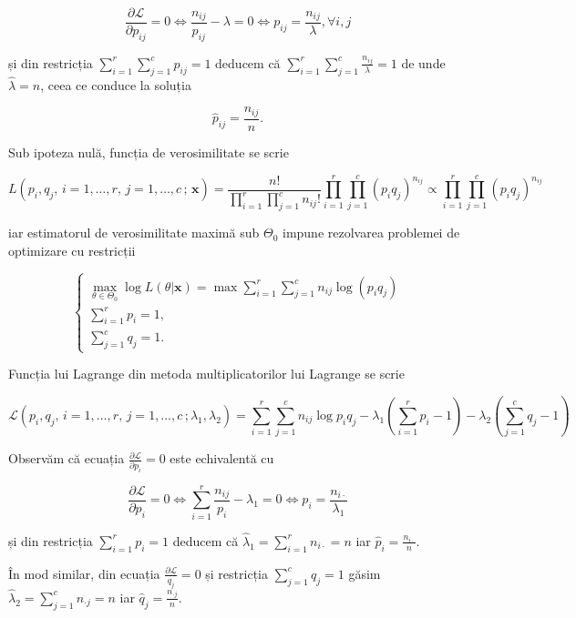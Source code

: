 \documentclass[]{article}
\begin{document}
\[
\frac{\partial \mathcal{L}}{\partial p_{ij}} = 0 \iff \frac{n_{ij}}{p_{ij}} - \lambda = 0 \iff p_{ij} = \frac{n_{ij}}{\lambda},\forall i,j
\]

și din restricția \(\sum_{i = 1}^{r}\sum_{j = 1}^{c}p_{ij} = 1\) deducem
că \(\sum_{i = 1}^{r}\sum_{j = 1}^{c}\frac{n_{ij}}{\lambda} = 1\) de
unde \(\hat{\lambda} = n\), ceea ce conduce la soluția

\[
  \boxed{\hat{p}_{ij} = \frac{n_{ij}}{n}}.
\]

Sub ipoteza nulă, funcția de verosimilitate se scrie

\[
L(p_{i}, q_{j},\,i = 1,\ldots, r,\, j = 1,\ldots,c\,;\,\mathbf{x}) = \frac{n!}{\prod_{i = 1}^{r}\prod_{j = 1}^{c} n_{ij}!}\prod_{i = 1}^{r}\prod_{j = 1}^{c} (p_{i}q_{j})^{n_{ij}}\propto \prod_{i = 1}^{r}\prod_{j = 1}^{c} (p_{i}q_{j})^{n_{ij}}
\]

iar estimatorul de verosimilitate maximă sub \(\Theta_0\) impune
rezolvarea problemei de optimizare cu restricții

\[
  \left\{\begin{array}{ll}
    \max_{\theta\in\Theta_0} \log L(\theta|\mathbf{x}) = \max \sum_{i = 1}^{r}\sum_{j = 1}^{c}n_{ij}\log(p_{i}q_{j})\\
    \sum_{i = 1}^{r}p_{i} = 1,\\
    \sum_{j = 1}^{c}q_{j} = 1.
  \end{array}\right.
\]

Funcția lui Lagrange din metoda multiplicatorilor lui Lagrange se scrie

\[
\mathcal{L}(p_{i}, q_{j},\,i = 1,\ldots, r,\, j = 1,\ldots,c\,;\lambda_1, \lambda_2) = \sum_{i = 1}^{r}\sum_{j = 1}^{c}n_{ij}\log{p_{i}q_{j}} - \lambda_1\left(\sum_{i = 1}^{r}p_{i} - 1\right) - \lambda_2\left(\sum_{j = 1}^{c}q_{j} - 1\right)
\]

Observăm că ecuația \(\frac{\partial \mathcal{L}}{\partial p_{i}} = 0\)
este echivalentă cu

\[
\frac{\partial \mathcal{L}}{\partial p_{i}} = 0 \iff \sum_{i = 1}^{r}\frac{n_{ij}}{p_i} - \lambda_1 = 0 \iff p_{i} = \frac{n_{i\cdot}}{\lambda_1}
\]

și din restricția \(\sum_{i = 1}^{r}p_{i} = 1\) deducem că
\(\hat{\lambda}_1 = \sum_{i = 1}^{r}n_{i\cdot} = n\) iar
\(\boxed{\hat{p}_i = \frac{n_{i\cdot}}{n}}\).

În mod similar, din ecuația \(\frac{\partial \mathcal{L}}{q_{j}} = 0\)
și restricția \(\sum_{j = 1}^{c}q_{j} = 1\) găsim
\(\hat{\lambda}_2 = \sum_{j = 1}^{c}n_{\cdot j} = n\) iar
\(\boxed{\hat{q}_j = \frac{n_{\cdot j}}{n}}\).
\end{document}
